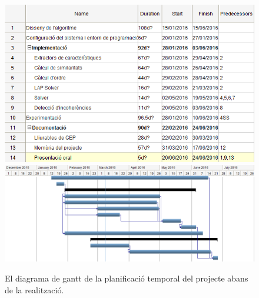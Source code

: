 \begin{figure}[!htb]
    \centering
    \includegraphics[width=\textwidth]{figures/gantt1.png}
    \includegraphics[width=\textwidth]{figures/gantt2.png}
    \caption{El diagrama de gantt de la planificació temporal del projecte abans de la realització.}
    \label{fig:gantt}
\end{figure}

